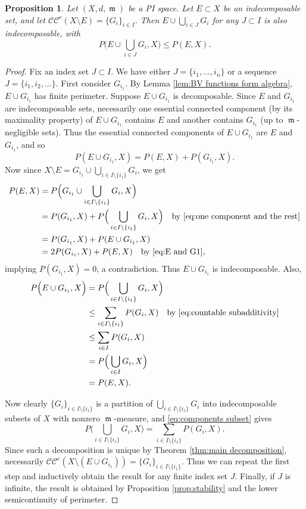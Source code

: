 \documentclass[11pt]{article}
\numberwithin{equation}{section}
\theoremstyle{plain}
\newtheorem{proposition}[equation]{Proposition}
\theoremstyle{definition}
\numberwithin{equation}{section}
\newcommand{\CC}{\mathcal{C}\mathcal{C}}
\DeclareMathOperator{\frm}{\mathfrak{m}}
\begin{document}
\begin{proposition}\label{prop:adding complement components}
	Let $(X,d,\frm)$ be a PI space.
	Let $E\subset X$ be an indecomposable set, and let $\CC^e(X\setminus E)=\{G_i\}_{i\in I}$.
	Then $E\cup \bigcup_{i\in J}G_i$ for any $J\subset I$ is also indecomposable, with
	\[
	P\Big(E\cup \bigcup_{i\in J}G_i,X\Big)\le P(E,X).
	\]
\end{proposition}
\begin{proof}
	Fix an index set $J\subset I$.
	We have either $J=\{i_1,\ldots,i_n\}$ or a sequence $J=\{i_1,i_2,\ldots\}$.
	First consider $G_{i_1}$.
	By Lemma \ref{lem:BV functions form algebra},
	$E\cup G_{i_1}$ has finite perimeter. Suppose $E\cup G_{i_1}$ is decomposable.
	Since $E$ and $G_{i_1}$ are indecomposable sets, necessarily one essential connected component
	(by its maximality property) of $E\cup G_{i_1}$ contains $E$ and another contains $G_{i_1}$
	(up to $\frm$-negligible sets).
	Thus the essential connected components of $E\cup G_{i_1}$ are $E$ and $G_{i_1}$, and so
	\begin{equation}\label{eq:E and G1}
	P(E\cup G_{i_1},X)=P(E,X)+P(G_{i_1},X).
	\end{equation}
	Now since $X\setminus E=G_{i_1}\cup \bigcup_{i\in I\setminus \{i_1\}}G_i$, we get
	\begin{align*}
	P(E,X)
	&= P\Big(G_{i_1}\cup \bigcup_{i\in I\setminus \{i_1\}}G_i,X\Big)\\
	&= P(G_{i_1},X)+P\Big(\bigcup_{i\in I\setminus \{i_1\}}G_i,X\Big)\quad\textrm{by }\eqref{eq:one component and the rest}\\
	&= P(G_{i_1},X)+P(E\cup G_{i_1},X)\\
	&= 2P(G_{i_1},X)+P(E,X)\quad\textrm{by }\eqref{eq:E and G1},
	\end{align*}
	implying $P(G_{i_1},X)=0$, a contradiction.
	Thus $E\cup G_{i_1}$ is indecomposable.
	Also,
	\begin{align*}
	P\Big(E\cup G_{i_1},X\Big)
	&=P\Big(\bigcup_{i\in I\setminus \{i_1\}}G_i,X\Big)\\
	&\le\sum_{i\in I\setminus \{i_1\}} P(G_i,X)\quad\textrm{by }\eqref{eq:countable subadditivity}\\
	&\le\sum_{i\in I} P(G_i,X)\\
	&=P\Big(\bigcup_{i\in I}G_i,X\Big)\\
	&=P(E,X).
	\end{align*}
	
	Now clearly
	$\{G_i\}_{i\in I\setminus \{i_1\}}$ is a partition of $\bigcup_{i\in I\setminus \{i_1\}}G_i$ into
	indecomposable subsets of $X$ with nonzero $\frm$-measure, and \eqref{eq:components subset} gives
	\[
	P\Big(\bigcup_{i\in I\setminus \{i_1\}}G_i,X\Big)=\sum_{i\in I\setminus \{i_1\}}P(G_i,X).
	\]
	Since such a decomposition is unique by
	Theorem \ref{thm:main decomposition}, necessarily
	$\CC^e(X\setminus (E\cup G_{i_1}))=\{G_{i}\}_{i\in I\setminus \{i_1\}}$.
	Thus we can repeat the first step and inductively obtain the result for any finite index set 
	$J$. Finally, if $J$ is infinite, the result is obtained by Proposition \ref{prop:stability}
	and the lower semicontinuity of perimeter.
\end{proof}
\end{document}
